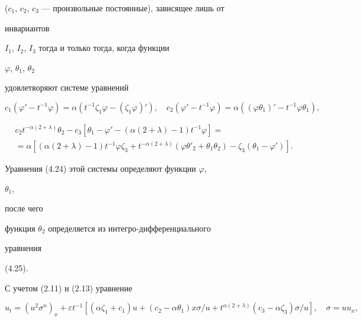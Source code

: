 ($c_1$, $c_2$, $c_3$ --- произвольные постоянные), зависящее лишь от


инвариантов


$I_1$, $I_2$, $I_3$ тогда и только тогда, когда функции


$\varphi$, $\theta_1$, $\theta_2$


удовлетворяют системе уравнений


\begin{equation}


c_1(\varphi'-t^{-1}\varphi)=\alpha(t^{-1}\zeta_1\varphi-


(\zeta_1\varphi)'),\quad


c_2(\varphi'-t^{-1}\varphi)=\alpha((\varphi\theta_1)'-


t^{-1}\varphi\theta_1),\tag{4.24}


\end{equation}


\begin{multline}


c_2t^{-\alpha(2+\lambda)}\theta_2-c_3[\theta_1-\varphi'-


(\alpha(2+\lambda)-1)t^{-1}\varphi]=\\


=\alpha[(\alpha(2+\lambda)-1)t^{-1}\varphi\zeta_3+


t^{-\alpha(2+\lambda)}(\varphi\theta'_2+\theta_1\theta_2)-


\zeta_3(\theta_1-\varphi')].\tag{4.25}


\end{multline}


Уравнения (4.24) этой системы определяют функции $\varphi$,


$\theta_1$,


после чего


функция $\theta_2$ определяется из интегро-дифференциального


уравнения


(4.25).





С учетом (2.11) и (2.13) уравнение


\begin{equation}


u_t=(u^2\sigma^n)_x+\varepsilon t^{-1}


[(\alpha\zeta_1+c_1)u+(c_2-\alpha\theta_1)x\sigma/u+


t^{\alpha(2+\lambda)}(c_3-\alpha\zeta_3)\sigma/u],\quad


\sigma=uu_x, \tag{4.26}


\end{equation}


